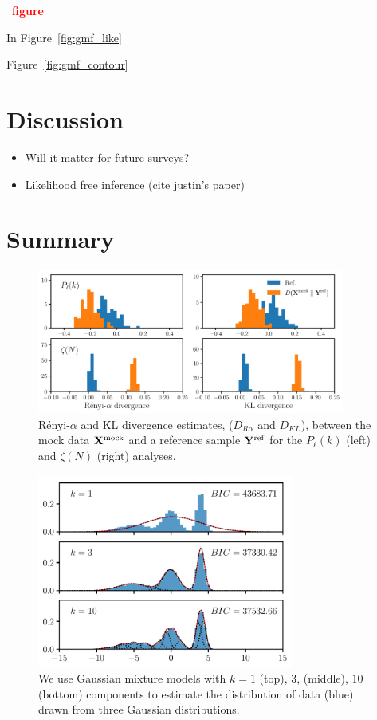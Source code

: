 \documentclass[12pt, letterpaper, preprint]{aastex}
\newcommand{\bitem}{\begin{itemize}}
\newcommand{\eitem}{\end{itemize}}
\newcommand{\todo}[1]{{\bf \textcolor{red}{#1}}}
\begin{document}
~\todo{figure} 

In Figure~\ref{fig:gmf_like}


Figure~\ref{fig:gmf_contour}

\section{Discussion}
\bitem
    \item Will it matter for future surveys? 
    \item Likelihood free inference (cite justin's paper) 
\eitem

\section{Summary}

\begin{figure}
\begin{center}
\includegraphics[width=0.9\textwidth]{figs/kNNdiverg_Gauss.pdf}
\caption{R\'enyi-$\alpha$ and KL divergence estimates, ($D_{R\alpha}$ and $D_{KL}$), 
between the mock data ${\bf X}^\mathrm{mock}$ and a reference sample 
${\bf Y}^\mathrm{ref}$ for the $P_\ell(k)$ (left) and $\zeta(N)$ (right) analyses.}
\label{fig:div_gauss}
\end{center}
\end{figure}


\begin{figure}
\begin{center}
\includegraphics[width=0.75\textwidth]{figs/GMM_pedagog.pdf}
\caption{We use Gaussian mixture models with $k = 1$ (top), $3$, (middle), $10$ (bottom) 
    components to estimate the distribution of data (blue) drawn from three Gaussian distributions.
}
\label{fig:gmf_ped}
\end{center}
\end{figure}
\end{document}
